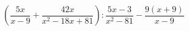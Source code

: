 \begin{ex}[type=expression]
	\begin{condition}
		\(\left( \dfrac{5x}{x-9} +\dfrac{42x}{x^2-18x+81}\right):\dfrac{5x-3}{x^2-81}-\dfrac{9(x+9)}{x-9}\)
	\end{condition}
\end{ex}